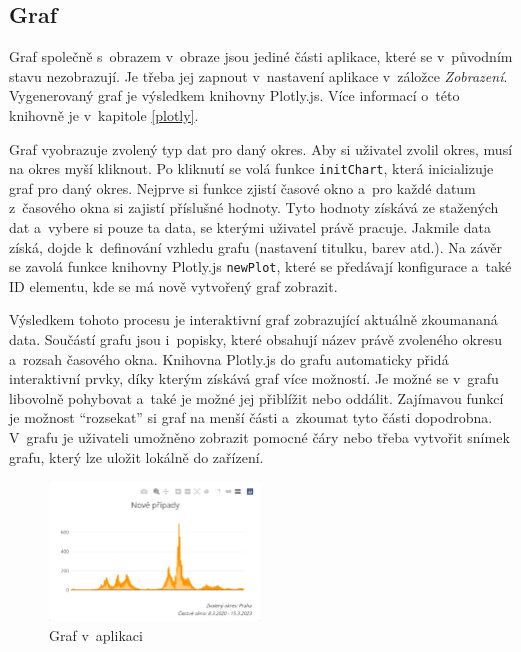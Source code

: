 \subsection{Graf}

Graf společně s~obrazem v~obraze jsou jediné části aplikace, které se v~původním stavu nezobrazují. Je třeba jej zapnout v~nastavení aplikace v~záložce \emph{Zobrazení}. Vygenerovaný graf je výsledkem knihovny Plotly.js. Více informací o~této knihovně je v~kapitole \ref{plotly}.

Graf vyobrazuje zvolený typ dat pro daný okres. Aby si uživatel zvolil okres, musí na okres myší kliknout. Po kliknutí se volá funkce \lstinline{initChart}, která inicializuje graf pro daný okres. Nejprve si funkce zjistí časové okno a~pro každé datum z~časového okna si zajistí příslušné hodnoty. Tyto hodnoty získává ze stažených dat a~vybere si pouze ta data, se kterými uživatel právě pracuje. Jakmile data získá, dojde k~definování vzhledu grafu (nastavení titulku, barev atd.). Na závěr se zavolá funkce knihovny Plotly.js \lstinline{newPlot}, které se předávají konfigurace a~také ID elementu, kde se má nově vytvořený graf zobrazit.

Výsledkem tohoto procesu je interaktivní graf zobrazující aktuálně zkoumananá data. Součástí grafu jsou i~popisky, které obsahují název právě zvoleného okresu a~rozsah časového okna. Knihovna Plotly.js do grafu automaticky přidá interaktivní prvky, díky kterým získává graf více možností. Je možné se v~grafu libovolně pohybovat a~také je možné jej přiblížit nebo oddálit. Zajímavou funkcí je možnost \enquote{rozsekat} si graf na menší části a~zkoumat tyto části dopodrobna. V~grafu je uživateli umožněno zobrazit pomocné čáry nebo třeba vytvořit snímek grafu, který lze uložit lokálně do zařízení.

\begin{figure}[h]
	\centering
	\includegraphics[width=0.5\textwidth]{Pictures/graf.png}
	\caption{Graf v~aplikaci}
	\label{fig:GrafApp}
\end{figure}

\label{graf}

